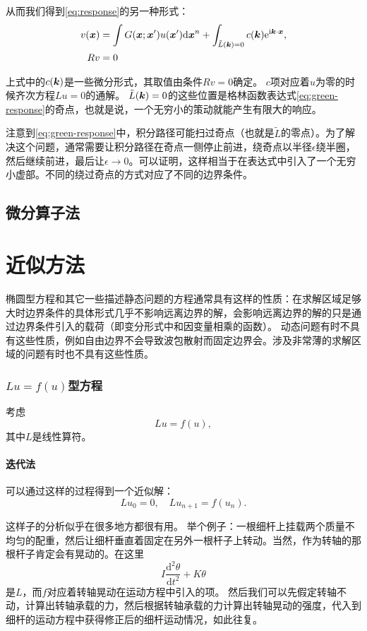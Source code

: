 \documentclass[UTF8, a4paper]{ctexart}
\newcommand*{\ii}{\mathrm{i}}
\newcommand*{\ee}{\mathrm{e}}
\begin{document}
从而我们得到\eqref{eq:response}的另一种形式：
\begin{equation}
    \begin{aligned}
        v(\vb*{x}) &= \int G(\vb*{x};\vb*{x}') u(\vb*{x}') \dd \vb*{x}^n 
        + \int_{\tilde{L}(\vb*{k})=0} c(\vb*{k}) \ee^{\ii \vb*{k} \cdot \vb*{x}}, \\
        R v &= 0
    \end{aligned}
\end{equation}

上式中的$c(\vb*{k})$是一些微分形式，其取值由条件$Rv=0$确定。
$c$项对应着$u$为零的时候齐次方程$Lu=0$的通解。
$\tilde{L}(\vb*{k})=0$的这些位置是格林函数表达式\eqref{eq:green-response}的奇点，也就是说，一个无穷小的策动就能产生有限大的响应。

注意到\eqref{eq:green-response}中，积分路径可能扫过奇点（也就是$\tilde{L}$的零点）。为了解决这个问题，通常需要让积分路径在奇点一侧停止前进，绕奇点以半径$\epsilon$绕半圈，然后继续前进，最后让$\epsilon \to 0$。可以证明，这样相当于在表达式中引入了一个无穷小虚部。不同的绕过奇点的方式对应了不同的边界条件。

\subsection{微分算子法}

\section{近似方法}

椭圆型方程和其它一些描述静态问题的方程通常具有这样的性质：在求解区域足够大时边界条件的具体形式几乎不影响远离边界的解，会影响远离边界的解的只是通过边界条件引入的载荷（即变分形式中和因变量相乘的函数）。
动态问题有时不具有这些性质，例如自由边界不会导致波包散射而固定边界会。涉及非常薄的求解区域的问题有时也不具有这些性质。

\subsubsection{$Lu=f(u)$型方程}
考虑
\[
    Lu = f(u),
\]
其中$L$是线性算符。

\paragraph{迭代法}可以通过这样的过程得到一个近似解：
\begin{equation}
    Lu_0 = 0, \quad Lu_{n+1} = f(u_n).
\end{equation}

这样子的分析似乎在很多地方都很有用。
举个例子：一根细杆上挂载两个质量不均匀的配重，然后让细杆垂直着固定在另外一根杆子上转动。当然，作为转轴的那根杆子肯定会有晃动的。在这里
\[
    I\frac{\mathrm{d}^2\theta}{\mathrm{d}t^2} + K \theta 
\]
是$L$，而$f$对应着转轴晃动在运动方程中引入的项。
然后我们可以先假定转轴不动，计算出转轴承载的力，然后根据转轴承载的力计算出转轴晃动的强度，代入到细杆的运动方程中获得修正后的细杆运动情况，如此往复。
\end{document}
